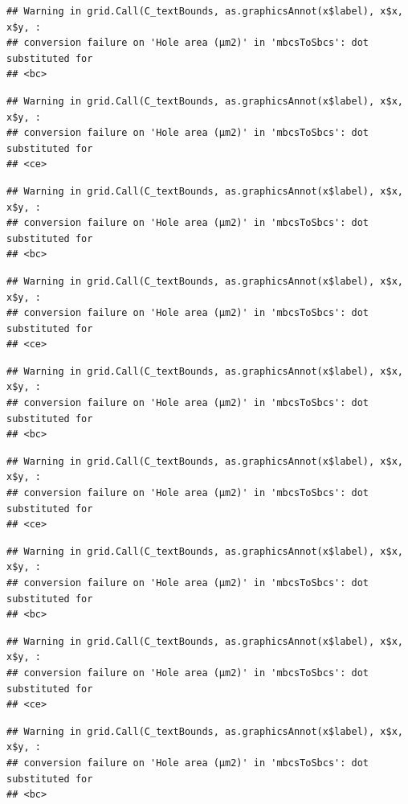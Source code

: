 \documentclass[
]{article}
\begin{document}
\begin{verbatim}
## Warning in grid.Call(C_textBounds, as.graphicsAnnot(x$label), x$x, x$y, :
## conversion failure on 'Hole area (μm2)' in 'mbcsToSbcs': dot substituted for
## <bc>
\end{verbatim}

\begin{verbatim}
## Warning in grid.Call(C_textBounds, as.graphicsAnnot(x$label), x$x, x$y, :
## conversion failure on 'Hole area (μm2)' in 'mbcsToSbcs': dot substituted for
## <ce>
\end{verbatim}

\begin{verbatim}
## Warning in grid.Call(C_textBounds, as.graphicsAnnot(x$label), x$x, x$y, :
## conversion failure on 'Hole area (μm2)' in 'mbcsToSbcs': dot substituted for
## <bc>
\end{verbatim}

\begin{verbatim}
## Warning in grid.Call(C_textBounds, as.graphicsAnnot(x$label), x$x, x$y, :
## conversion failure on 'Hole area (μm2)' in 'mbcsToSbcs': dot substituted for
## <ce>
\end{verbatim}

\begin{verbatim}
## Warning in grid.Call(C_textBounds, as.graphicsAnnot(x$label), x$x, x$y, :
## conversion failure on 'Hole area (μm2)' in 'mbcsToSbcs': dot substituted for
## <bc>
\end{verbatim}

\begin{verbatim}
## Warning in grid.Call(C_textBounds, as.graphicsAnnot(x$label), x$x, x$y, :
## conversion failure on 'Hole area (μm2)' in 'mbcsToSbcs': dot substituted for
## <ce>
\end{verbatim}

\begin{verbatim}
## Warning in grid.Call(C_textBounds, as.graphicsAnnot(x$label), x$x, x$y, :
## conversion failure on 'Hole area (μm2)' in 'mbcsToSbcs': dot substituted for
## <bc>
\end{verbatim}

\begin{verbatim}
## Warning in grid.Call(C_textBounds, as.graphicsAnnot(x$label), x$x, x$y, :
## conversion failure on 'Hole area (μm2)' in 'mbcsToSbcs': dot substituted for
## <ce>
\end{verbatim}

\begin{verbatim}
## Warning in grid.Call(C_textBounds, as.graphicsAnnot(x$label), x$x, x$y, :
## conversion failure on 'Hole area (μm2)' in 'mbcsToSbcs': dot substituted for
## <bc>
\end{verbatim}
\end{document}
